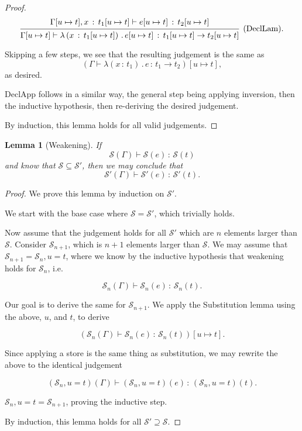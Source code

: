 \documentclass{article}
\newtheorem{lemma}{Lemma}
\newcommand{\G}{\Gamma}
\newcommand{\St}{\mathcal{S}}
\newcommand{\tp}{t}
\newcommand{\uv}{u}
\newcommand{\e}{e}
\newcommand{\x}{x}
\newcommand{\withtp}[2]{{#1} \,:\, {#2}}
\newcommand{\lamtp}[3]{\lambda \left( {\withtp {#1} {#2}} \right) \,.\, {#3}}
\newcommand{\arr}[2]{{#1} \to {#2}}
\newcommand{\hastp}[3]{#1 \vdash {\withtp {#2} {#3}}}
\newcommand{\deduct}[3][]
{
  \begin{prooftree}
    \hypo{#2}
    \infer1[\text{#1}]{#3}
  \end{prooftree}
}
\begin{document}
\begin{proof}
  \[
    \deduct
    {\hastp {\G[\uv \mapsto \tp], {\withtp \x {\tp_1[\uv \mapsto \tp]}}} {\e[\uv
  \mapsto \tp]}{\tp_2[\uv \mapsto \tp]}}
    {\hastp {\G[\uv \mapsto \tp]} {\lamtp {\x} {\tp_1[\uv \mapsto \tp]} {\e[\uv
    \mapsto \tp]}} {\arr {\tp_1[\uv \mapsto \tp]} {\tp_2[\uv \mapsto \tp]}}}
    {\text{(DeclLam)}}.
  \]

  Skipping a few steps, we see that the resulting judgement is the same as
  \[ \left(\hastp \G {\lamtp {\x} {\tp_1} {\e}} {\arr {\tp_1}
  {\tp_2}}\right)[\uv \mapsto \tp], \]
  as desired.

  DeclApp follows in a similar way, the general step being applying inversion,
  then the inductive hypothesis, then re-deriving the desired judgement.

  By induction, this lemma holds for all valid judgements.

\end{proof}

\begin{lemma}[Weakening]
  If
  \[\hastp {\St(\G)} {\St(\e)} {\St(\tp)}\]
  and know that \(\St \subseteq \St'\), then we may conclude that
  \[\hastp {\St'(\G)} {\St'(\e)} {\St'(\tp)}.\]
\end{lemma}

\begin{proof}
  We prove this lemma by induction on \(\St'\).

  We start with the base case where \(\St = \St'\), which trivially holds.

  Now assume that the judgement holds for all \(\St'\) which are \(n\) elements
  larger than \(\St\). Consider \(\St_{n+1}\), which is \(n+1\) elements larger
  than \(\St\). We may assume that \(\St_{n+1} = \St_n, \uv = \tp\), where we
  know by the inductive hypothesis that weakening holds for \(\St_n\), i.e.

  \[\hastp {\St_n(\G)} {\St_n(\e)} {\St_n(\tp)}.\]

  Our goal is to derive the same for \(\St_{n+1}\). We apply the Substitution
  lemma using the above, \(\uv\), and \(\tp\), to derive

  \[\left(\hastp {\St_n(\G)} {\St_n(\e)} {\St_n(\tp)}\right)[\uv \mapsto \tp].\]

  Since applying a store is the same thing as substitution, we may rewrite the
  above to the identical judgement

  \[\hastp {(\St_n, \uv = \tp)(\G)} {(\St_n, \uv = \tp)(\e)} {(\St_n, \uv = \tp)(\tp)}.\]

  \(\St_n, \uv = \tp = \St_{n+1}\), proving the inductive step.

  By induction, this lemma holds for all \(\St' \supseteq \St\).
\end{proof}
\end{document}
